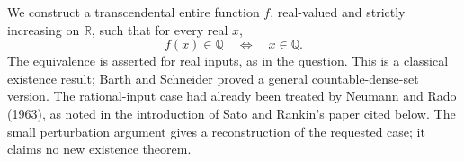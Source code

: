 We construct a transcendental entire function $f$, real-valued and strictly increasing on $\mathbb R$, such that for every real $x$,
\[
 f(x)\in\mathbb Q\quad\Longleftrightarrow\quad x\in\mathbb Q.\tag{1}
\]
The equivalence is asserted for real inputs, as in the question. This is a classical existence result; Barth and Schneider proved a general countable-dense-set version. The rational-input case had already been treated by Neumann and Rado (1963), as noted in the introduction of Sato and Rankin's paper cited below. The small perturbation argument gives a reconstruction of the requested case; it claims no new existence theorem.
